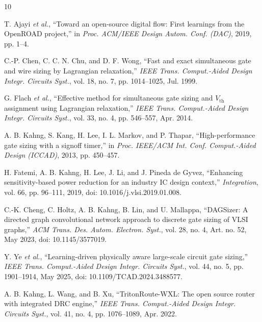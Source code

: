 \documentclass[journal]{IEEEtran}
\begin{document}
\begin{thebibliography}{10}

T. Ajayi \emph{et al.}, \textquotedblleft Toward an open-source digital flow: First learnings from the OpenROAD project,\textquotedblright{} in \emph{Proc. ACM/IEEE Design Autom. Conf. (DAC)}, 2019, pp. 1--4.

C.-P. Chen, C. C. N. Chu, and D. F. Wong, \textquotedblleft Fast and exact simultaneous gate and wire sizing by Lagrangian relaxation,\textquotedblright{} \emph{IEEE Trans. Comput.-Aided Design Integr. Circuits Syst.}, vol. 18, no. 7, pp. 1014--1025, Jul. 1999.

G. Flach \emph{et al.}, \textquotedblleft Effective method for simultaneous gate sizing and \(V_{\mathrm{th}}\) assignment using Lagrangian relaxation,\textquotedblright{} \emph{IEEE Trans. Comput.-Aided Design Integr. Circuits Syst.}, vol. 33, no. 4, pp. 546--557, Apr. 2014.

A. B. Kahng, S. Kang, H. Lee, I. L. Markov, and P. Thapar, \textquotedblleft High-performance gate sizing with a signoff timer,\textquotedblright{} in \emph{Proc. IEEE/ACM Int. Conf. Comput.-Aided Design (ICCAD)}, 2013, pp. 450--457.

H. Fatemi, A. B. Kahng, H. Lee, J. Li, and J. Pineda de Gyvez, \textquotedblleft Enhancing sensitivity-based power reduction for an industry IC design context,\textquotedblright{} \emph{Integration}, vol. 66, pp. 96--111, 2019, doi: 10.1016/j.vlsi.2019.01.008.

C.-K. Cheng, C. Holtz, A. B. Kahng, B. Lin, and U. Mallappa, \textquotedblleft DAGSizer: A directed graph convolutional network approach to discrete gate sizing of VLSI graphs,\textquotedblright{} \emph{ACM Trans. Des. Autom. Electron. Syst.}, vol. 28, no. 4, Art. no. 52, May 2023, doi: 10.1145/3577019.

Y. Ye \emph{et al.}, \textquotedblleft Learning-driven physically aware large-scale circuit gate sizing,\textquotedblright{} \emph{IEEE Trans. Comput.-Aided Design Integr. Circuits Syst.}, vol. 44, no. 5, pp. 1901--1914, May 2025, doi: 10.1109/TCAD.2024.3488577.

A. B. Kahng, L. Wang, and B. Xu, \textquotedblleft TritonRoute-WXL: The open source router with integrated DRC engine,\textquotedblright{} \emph{IEEE Trans. Comput.-Aided Design Integr. Circuits Syst.}, vol. 41, no. 4, pp. 1076--1089, Apr. 2022.


\end{thebibliography}
\end{document}
